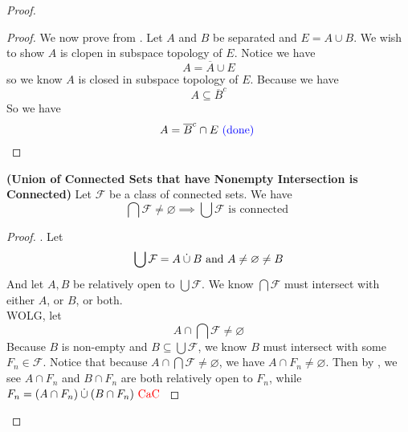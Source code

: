\documentclass{report}
\begin{document}
\begin{proof}
\begin{proof}
We now prove from . Let $A$ and  $B$ be separated and  $E=A\cup B$. We wish to show $A$ is clopen in subspace topology of  $E$. Notice we have 
\begin{equation}
A=\overline{A}\cup E
\end{equation}
so we know $A$ is closed in subspace topology of  $E$. Because we have
\begin{equation}
A\subseteq \overline{B}^c
\end{equation}
So we have
\begin{equation}
A=\overline{B}^c \cap E \textcolor{blue}{\text{ (done) }}
\end{equation}
\end{proof}
\begin{theorem}
\label{3.3.3}
\textbf{(Union of Connected Sets that have Nonempty Intersection is Connected)} Let $\mathcal{F}$ be a class of connected sets. We have 
\begin{equation}
\bigcap \mathcal{F}\neq \varnothing \implies \bigcup \mathcal{F}\text{ is connected }
\end{equation}
\end{theorem}
\begin{proof}
. Let 
\begin{equation}
\bigcup  \mathcal{F}= A \mathbin{\dot{\cup}} B\text{ and }A\neq \varnothing\neq B
\end{equation}
And let $A,B$ be relatively open to  $\bigcup \mathcal{F}$. We know $\bigcap \mathcal{F}$ must intersect with either $A$, or  $B$, or both.\\

WOLG, let
\begin{equation}
A\cap \bigcap \mathcal{F}\neq \varnothing
\end{equation}
Because $B$ is non-empty and $B\subseteq \bigcup \mathcal{F}$, we know $B$ must intersect with some $F_n\in \mathcal{F}$. Notice that because $A\cap \bigcap \mathcal{F}\neq \varnothing$, we have $A\cap F_n\neq \varnothing$. Then by , we see $A\cap F_n$ and $B\cap F_n$ are both relatively open to $F_n$, while $F_n= (A\cap F_n)\mathbin{\dot{\cup}} (B\cap F_n)\text{ \textcolor{red}{CaC} }$ 
\end{proof}


\end{proof}
\end{document}
